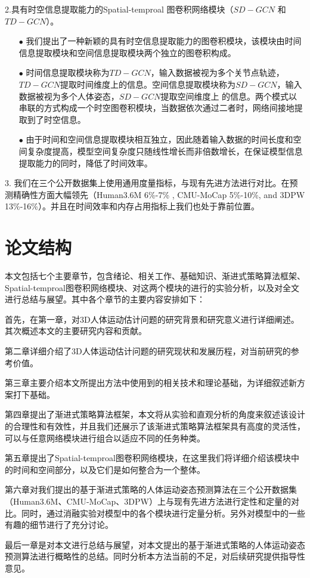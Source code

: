 2.具有时空信息提取能力的Spatial-temproal 图卷积网络模块（$SD−GCN$ 和 $TD−GCN$）。
\begin{enumerate}[topsep = 0 pt, itemsep= 0 pt, parsep=0pt, partopsep=0pt, leftmargin=44pt, itemindent=0pt, labelsep=6pt]
	\item[$\bullet$] 我们提出了一种新颖的具有时空信息提取能力的图卷积模块，该模块由时间信息提取模块和空间信息提取模块两个独立的图卷积构成。
	\item[$\bullet$] 时间信息提取模块称为$TD-GCN$，输入数据被视为多个关节点轨迹，$TD-GCN$提取时间维度上的信息。空间信息提取模块称为$SD-GCN$，输入数据被视为多个人体姿态，$SD-GCN$提取空间维度上 的信息。两个模式以串联的方式构成一个时空图卷积模块，当数据依次通过二者时，网络间接地提取到了时空信息。
	\item[$\bullet$] 由于时间和空间信息提取模块相互独立，因此随着输入数据的时间长度和空间复杂度提高，模型空间复杂度只随线性增长而非倍数增长，在保证模型信息提取能力的同时，降低了时间效率。
\end{enumerate}

3. 我们在三个公开数据集上使用通用度量指标，与现有先进方法进行对比。在预测精确性方面大幅领先（Human3.6M 6\%-7\% , CMU-MoCap 5\%-10\%, and 3DPW 13\%-16\%）。并且在时间效率和内存占用指标上我们也处于靠前位置。

\section{论文结构}
本文包括七个主要章节，包含绪论、相关工作、基础知识、渐进式策略算法框架、Spatial-temproal图卷积网络模块、对这两个模块的进行的实验分析，以及对全文进行总结与展望。其中各个章节的主要内容安排如下：

首先，在第一章，对3D人体运动估计问题的研究背景和研究意义进行详细阐述。其次概述本文的主要研究内容和贡献。

第二章详细介绍了3D人体运动估计问题的研究现状和发展历程，对当前研究的参考价值。

第三章主要介绍本文所提出方法中使用到的相关技术和理论基础，为详细叙述新方案打下基础。

第四章提出了渐进式策略算法框架，本文将从实验和直观分析的角度来叙述该设计的合理性和有效性，并且我们还展示了该渐进式策略算法框架具有高度的灵活性，可以与任意网络模块进行组合以适应不同的任务种类。

第五章提出了Spatial-temproal图卷积网络模块，在这里我们将详细介绍该模块中的时间和空间部分，以及它们是如何整合为一个整体。

第六章对我们提出的基于渐进式策略的人体运动姿态预测算法在三个公开数据集（Human3.6M、CMU-MoCap、3DPW）上与现有先进方法进行定性和定量的对比。同时，通过消融实验对模型中的各个模块进行定量分析。另外对模型中的一些有趣的细节进行了充分讨论。

最后一章是对本文进行总结与展望，对本文提出的基于渐进式策略的人体运动姿态预测算法进行概略性的总结。同时分析本方法当前的不足，对后续研究提供指导性意见。




